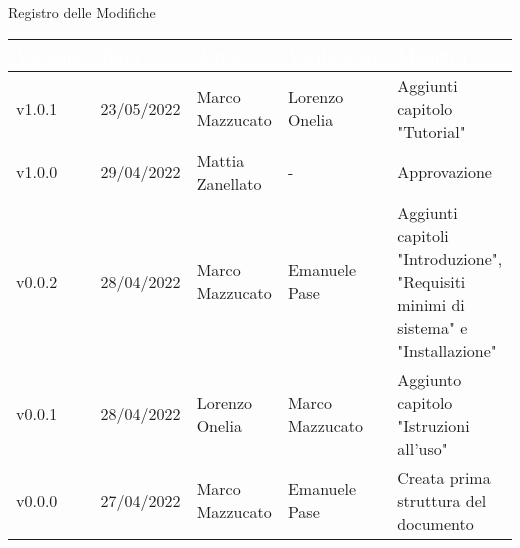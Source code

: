 \begin{center}
  \huge{Registro delle Modifiche}
\end{center}
\renewcommand\arraystretch{1,5}
{\centering
\begin{longtable}{|C{1.8cm}|C{2.1cm}|C{2cm}|C{2.4cm}|L{4.4cm}|}
  \hline
  \textcolor[HTML]{FFFFFF}{\textbf{Versione}} & \textcolor[HTML]{FFFFFF}{\textbf{Data}} & \textcolor[HTML]{FFFFFF}{\textbf{Autore}}  & \textcolor[HTML]{FFFFFF}{\textbf{Verificatore}} & \textcolor[HTML]{FFFFFF}{\textbf{Modifica}}    \\ \hline
  v1.0.1      & 23/05/2022    & Marco Mazzucato   &  Lorenzo Onelia      & Aggiunti capitolo "Tutorial"  \\ \hline
  v1.0.0        & 29/04/2022    & Mattia Zanellato    & -    & Approvazione  \\ \hline
  v0.0.2      & 28/04/2022    & Marco Mazzucato   & Emanuele Pase       & Aggiunti capitoli "Introduzione", "Requisiti minimi di sistema" e "Installazione"\\ \hline
  v0.0.1        & 28/04/2022    & Lorenzo Onelia    & Marco Mazzucato       & Aggiunto capitolo "Istruzioni all'uso" \\ \hline
  v0.0.0        & 27/04/2022    & Marco Mazzucato   &  Emanuele Pase     & Creata prima struttura del documento \\ \hline
\end{longtable}}

\renewcommand\arraystretch{1}
